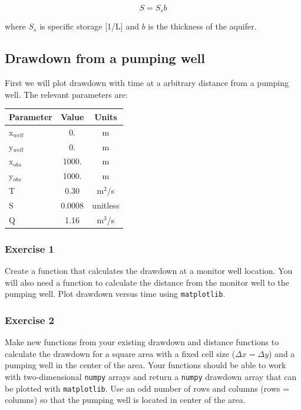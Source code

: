 \documentclass[11pt, oneside]{article}   	%
\begin{document}
\begin{equation}
S = S_s b
\end{equation}

\noindent where $S_s$ is specific storage [1/L] and $b$ is the thickness of the aquifer.

\subsection{Drawdown from a pumping well}

First we will plot drawdown with time at a arbitrary distance from a  pumping well. The relevant parameters are:

\begin{table}[htbp]
   \centering
   \begin{tabular}{@{} lcc @{}} %
      \toprule
      Parameter    & Value & Units\\
      \midrule
      x$_{well}$     & 0.     & m \\
      y$_{well}$     & 0.     & m \\
      x$_{obs}$      & 1000.  & m \\
      y$_{obs}$      & 1000.  & m \\
      T              & 0.30   & m$^2$/s \\
      S              & 0.0008 & unitless \\
      Q              & 1.16   &  m$^3$/s \\
      \bottomrule
   \end{tabular}
   \label{tab:aqparams}
\end{table}

\subsubsection{Exercise 1}

Create a function that calculates the drawdown at a monitor well location. You will also need a function to calculate the distance from the monitor well to the pumping well. Plot drawdown versus time using \texttt{matplotlib}.

\subsubsection{Exercise 2}

Make new functions from your existing drawdown and distance functions to calculate the drawdown for a square area with a fixed cell size ($\Delta x = \Delta y$) and a pumping well in the center of the area. Your functions should be able to work with two-dimensional \texttt{numpy} arrays and return a \texttt{numpy} drawdown array that can be plotted with \texttt{matplotlib}. Use an odd number of rows and columns (rows = columns) so that the pumping well is located in center of the area.
\end{document}
